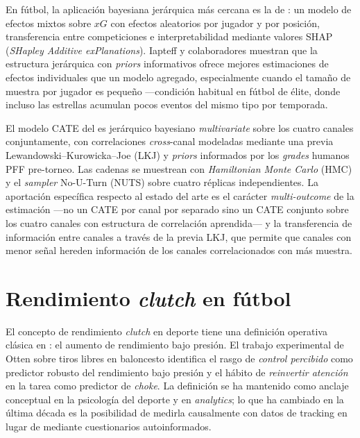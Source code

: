 En fútbol, la aplicación bayesiana jerárquica más cercana es la de
\textcite{Iapteff2025}: un modelo de efectos mixtos sobre $xG$ con
efectos aleatorios por jugador y por posición, transferencia entre
competiciones e interpretabilidad mediante valores SHAP
(\textit{SHapley Additive exPlanations}). Iapteff y
colaboradores muestran que la estructura jerárquica con \textit{priors}
informativos ofrece mejores estimaciones de efectos individuales que
un modelo agregado, especialmente cuando el tamaño de muestra por
jugador es pequeño ---condición habitual en fútbol de élite, donde
incluso las estrellas acumulan pocos eventos del mismo tipo por
temporada.

El modelo CATE del \CCV es jerárquico bayesiano \textit{multivariate}
sobre los cuatro canales conjuntamente, con correlaciones
\textit{cross}-canal modeladas mediante una previa
Lewandowski--Kurowicka--Joe (LKJ) y \textit{priors} informados por
los \textit{grades} humanos PFF pre-torneo. Las cadenas se muestrean
con \textit{Hamiltonian Monte Carlo} (HMC) y el \textit{sampler}
No-U-Turn (NUTS) sobre cuatro réplicas independientes. La aportación
específica respecto al estado del arte es el carácter
\textit{multi-outcome} de la estimación ---no un CATE por canal por
separado sino un CATE conjunto sobre los cuatro canales con estructura
de correlación aprendida--- y la transferencia de información entre
canales a través de la previa LKJ, que permite que canales con menor
señal hereden información de los canales correlacionados con más
muestra.


\section{Rendimiento \textit{clutch} en fútbol}
\label{sec:sota-clutch}

El concepto de rendimiento \textit{clutch} en deporte tiene una
definición operativa clásica en \textcite{Otten2009Clutch}: el aumento
de rendimiento bajo presión. El trabajo experimental de Otten sobre
tiros libres en baloncesto identifica el rasgo de \textit{control
percibido} como predictor robusto del rendimiento bajo presión y el
hábito de \textit{reinvertir atención} en la tarea como predictor de
\textit{choke}. La definición se ha mantenido como anclaje conceptual
en la psicología del deporte y en \textit{analytics}; lo que ha
cambiado en la última década es la posibilidad de medirla causalmente
con datos de tracking en lugar de mediante cuestionarios autoinformados.

